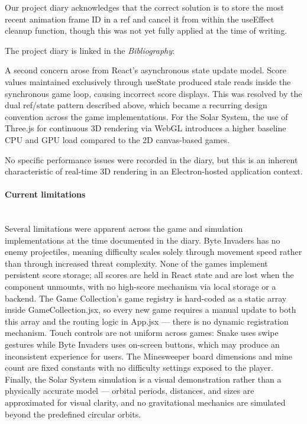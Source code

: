 \documentclass[a4paper,12pt]{article}
\begin{document}
Our project diary acknowledges that the correct solution is to store the most recent animation frame ID in a ref and cancel it from within the useEffect cleanup function, though this was not yet fully applied at the time of writing.

\begin{notebox}
The project diary is linked in the \textit{Bibliography}:~\cite{diary}
\end{notebox}

A second concern arose from React's asynchronous state update model. Score values maintained exclusively through useState produced stale reads inside the synchronous game loop, causing incorrect score displays. This was resolved by the dual ref/state pattern described above, which became a recurring design convention across the game implementations.
For the Solar System, the use of Three.js for continuous 3D rendering via WebGL introduces a higher baseline CPU and GPU load compared to the 2D canvas-based games. 

No specific performance issues were recorded in the diary, but this is an inherent characteristic of real-time 3D rendering in an Electron-hosted application context.

\paragraph{Current limitations}\mbox{} \\
Several limitations were apparent across the game and simulation implementations at the time documented in the diary. Byte Invaders has no enemy projectiles, meaning difficulty scales solely through movement speed rather than through increased threat complexity. None of the games implement persistent score storage; all scores are held in React state and are lost when the component unmounts, with no high-score mechanism via local storage or a backend. The Game Collection's game registry is hard-coded as a static array inside GameCollection.jsx, so every new game requires a manual update to both this array and the routing logic in App.jsx — there is no dynamic registration mechanism. Touch controls are not uniform across games: Snake uses swipe gestures while Byte Invaders uses on-screen buttons, which may produce an inconsistent experience for users. The Minesweeper board dimensions and mine count are fixed constants with no difficulty settings exposed to the player. Finally, the Solar System simulation is a visual demonstration rather than a physically accurate model — orbital periods, distances, and sizes are approximated for visual clarity, and no gravitational mechanics are simulated beyond the predefined circular orbits.
\end{document}
